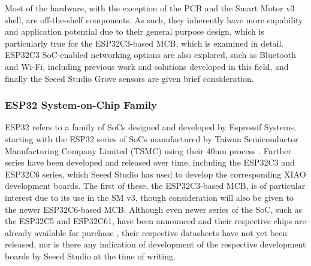  Most of the hardware, with the exception of the PCB and the Smart Motor v3 shell, are off-the-shelf components. As such, they inherently have more capability and application potential due to their general purpose design, which is particularly true for the ESP32C3-based MCB, which is examined in detail. ESP32C3 SoC-enabled networking options are also explored, such as Bluetooth and Wi-Fi, including previous work and solutions developed in this field, and finally the Seeed Studio Grove sensors are given brief consideration.

\subsubsection{\label{sec:rev_esp}ESP32 System-on-Chip Family}

ESP32 refers to a family of SoCs designed and developed by Espressif Systems, starting with the ESP32 series of SoCs manufactured by Taiwan Semiconductor Manufacturing Company Limited (TSMC) using their 40nm process \citep{espressif_systems_esp32_2025}.
Further series have been developed and released over time, including the ESP32C3 and ESP32C6 series, which Seeed Studio has used to develop the corresponding XIAO development boards. The first of these, the ESP32C3-based MCB, is of particular interest due to its use in the SM v3, though consideration will also be given to the newer ESP32C6-based MCB. Although even newer series of the SoC, such as the ESP32C5 and ESP32C61, have been announced and their respective chips are already available for purchase \citep{espressif_systems_esp_nodate}, their respective datasheets have not yet been released, nor is there any indication of development of the respective development boards by Seeed Studio at the time of writing.

